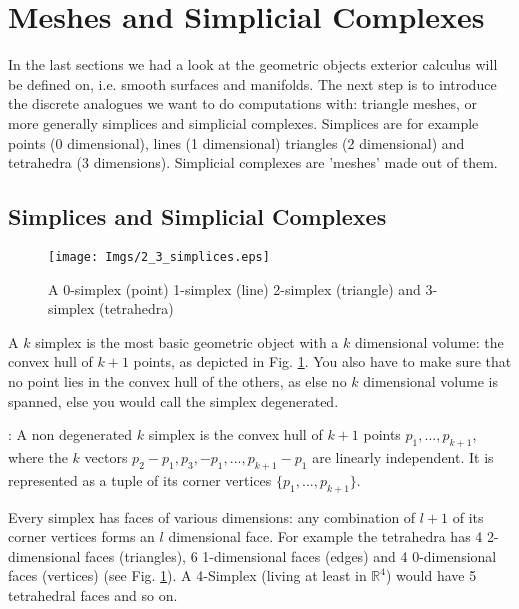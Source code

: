 \newpage
\section{Meshes and Simplicial Complexes}

In the last sections we had a look at the geometric objects exterior calculus will be defined on, i.e. smooth surfaces and manifolds. The next step is to introduce the discrete analogues we want to do computations with: triangle meshes, or more generally simplices and simplicial complexes. Simplices are for example points (0 dimensional), lines (1 dimensional) triangles (2 dimensional) and tetrahedra (3 dimensions). Simplicial complexes are 'meshes' made out of them.

\subsection{Simplices and Simplicial Complexes}

\begin{figure}[b]
\begin{center}
\texttt{[image: Imgs/2\_3\_simplices.eps]}
\end{center}
\caption{A 0-simplex (point) 1-simplex (line) 2-simplex (triangle) and 3-simplex (tetrahedra) }
\label{fig::2_3_simplices}
\end{figure}

A $k$ simplex is the most basic geometric object with a $k$ dimensional volume: the convex hull of $k+1$ points, as depicted in Fig. \ref{fig::2_3_simplices}. You also have to make sure that no point lies in the convex hull of the others, as else no $k$ dimensional volume is spanned, else you would call the simplex degenerated.

\begin{definition}[Simplex]: A non degenerated $k$ simplex is the convex hull of $k + 1$ points $p_1,...,p_{k+1}$, where the $k$ vectors $p_2 -p_1, p_3,-p_1, ..., p_{k+1} -p_1$ are linearly independent. It is represented as a tuple of its corner vertices $\{p_1,...,p_{k+1}\}$.
\end{definition}

Every simplex has faces of various dimensions: any combination of $l+1$ of its corner vertices forms an $l$ dimensional face. For example the tetrahedra has 4 2-dimensional faces (triangles), 6 1-dimensional faces (edges) and 4 0-dimensional faces (vertices) (see Fig. \ref{fig::2_3_simplices}). A 4-Simplex (living at least in $\mathbb R^4$) would have 5 tetrahedral faces and so on.

